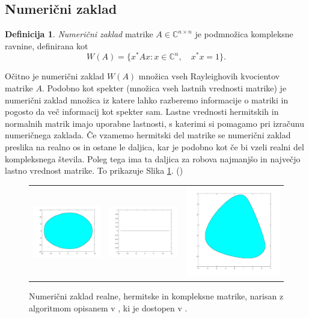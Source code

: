 \documentclass[12pt,a4paper]{amsart}
\theoremstyle{definition}
\newtheorem{definicija}{Definicija}[section]
\theoremstyle{plain}
\newcommand{\C}{\mathbb C}
\begin{document}
\subsection{Numerični zaklad}
\begin{definicija}
\emph{Numerični zaklad} matrike $A \in \C^{n\times n}$ je pod\-mno\-ži\-ca kompleksne ravnine, definirana kot
$$W(A)=\{x^\ast Ax: x \in \C^n,\quad x^\ast x=1\}.$$
\end{definicija}
Očitno je numerični zaklad $W(A)$ množica vseh Rayleighovih kvocientov matrike $A$. Podobno kot spekter (množica vseh lastnih vrednosti matrike) je numerični zaklad množica iz katere lahko razberemo informacije o matriki in pogosto da več informacij kot spekter sam.
Lastne vrednosti hermitskih in normalnih matrik imajo uporabne lastnosti, s katerimi si pomagamo pri izračunu numeričnega zaklada.
Če vzamemo hermitski del matrike se numerični zaklad preslika na realno os in ostane le daljica, kar je podobno kot če bi vzeli realni del kompleksnega števila. Poleg tega ima ta daljica za robova najmanjšo in največjo lastno vrednost matrike.
To prikazuje Slika \ref{fig:zaklad}. (\cite{zaloga})\\
\begin{figure} [h]
\begin{tabular}{lll}
\includegraphics[width=.225\textwidth]{real.jpg}
&
\includegraphics[width=.225\textwidth]{hermit.jpg}
&
\includegraphics[width=.225\textwidth]{kompleks.jpg}
\end{tabular}
\caption{Numerični zaklad realne, hermitske in kompleksne matrike, narisan z algoritmom opisanem v \cite{zaloga}, ki je dostopen v \cite{nr}.}
\label{fig:zaklad}
\end{figure}
\end{document}
